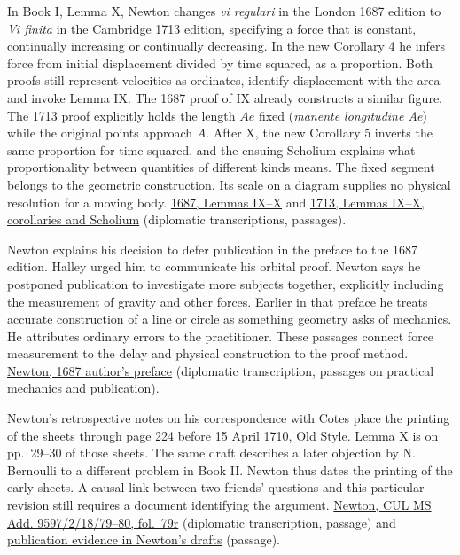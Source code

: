 \documentclass[11pt,a4paper]{article}
\begin{document}
In Book I, Lemma X, Newton changes \emph{vi regulari} in the London 1687
edition to \emph{Vi finita} in the Cambridge 1713 edition, specifying a
force that is constant, continually increasing or continually
decreasing. In the new Corollary 4 he infers force from initial
displacement divided by time squared, as a proportion. Both proofs still
represent velocities as ordinates, identify displacement with the area
and invoke Lemma IX. The 1687 proof of IX already constructs a similar
figure. The 1713 proof explicitly holds the length \(Ae\) fixed
(\emph{manente longitudine Ae}) while the original points approach
\(A\). After X, the new Corollary 5 inverts the same proportion for time
squared, and the ensuing Scholium explains what proportionality between
quantities of different kinds means. The fixed segment belongs to the
geometric construction. Its scale on a diagram supplies no physical
resolution for a moving body.
\href{https://www.newtonproject.ox.ac.uk/view/texts/diplomatic/NATP00077\#par25}{1687,
Lemmas IX--X} and
\href{https://www.newtonproject.ox.ac.uk/view/texts/diplomatic/NATP00082\#par26}{1713,
Lemmas IX--X, corollaries and Scholium} (diplomatic transcriptions,
passages).

Newton explains his decision to defer publication in the preface to the
1687 edition. Halley urged him to communicate his orbital proof. Newton
says he postponed publication to investigate more subjects together,
explicitly including the measurement of gravity and other forces.
Earlier in that preface he treats accurate construction of a line or
circle as something geometry asks of mechanics. He attributes ordinary
errors to the practitioner. These passages connect force measurement to
the delay and physical construction to the proof method.
\href{https://www.newtonproject.ox.ac.uk/view/texts/diplomatic/NATP00074}{Newton,
1687 author's preface} (diplomatic transcription, passages on practical
mechanics and publication).

Newton's retrospective notes on his correspondence with Cotes place the
printing of the sheets through page 224 before 15 April 1710, Old Style.
Lemma X is on pp.~29--30 of those sheets. The same draft describes a
later objection by N. Bernoulli to a different problem in Book II.
Newton thus dates the printing of the early sheets. A causal link
between two friends' questions and this particular revision still
requires a document identifying the argument.
\href{https://www.newtonproject.ox.ac.uk/view/texts/diplomatic/NATP00283}{Newton,
CUL MS Add. 9597/2/18/79--80, fol.~79r} (diplomatic transcription,
passage) and
\href{newton-NATP00385-audit.md\#publication-and-controversy}{publication
evidence in Newton's drafts} (passage).
\end{document}
